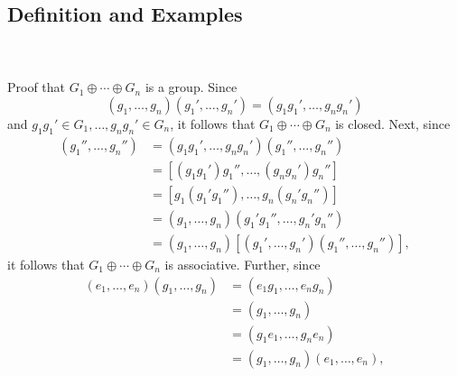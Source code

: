 \documentclass{article}
\theoremstyle{definition}
\newtheorem{definition}{Definition}[section]
\begin{document}
     \subsection{Definition and Examples}
     \\ \\
     Proof that $G_1 \oplus \cdots \oplus G_n$ is  a group. Since
     \begin{equation*}
         (g_1,\dots,g_n)(g_1',\dots,g_n') = (g_1g_1',\dots,g_ng_n')
     \end{equation*}
     and $g_1g_1' \in G_1, \dots, g_ng_n' \in G_n$, it follows that $G_1 \oplus \cdots \oplus G_n$ is closed. Next, since
     \begin{align*}
         [(g_1,\dots,g_n)(g_1',\dots,g_n')](g_1'',\dots,g_n'') &= (g_1g_1',\dots,g_ng_n')(g_1'',\dots,g_n'') \\
         &= [(g_1g_1')g_1'',\dots,(g_ng_n')g_n''] \\
         &= [g_1(g_1'g_1''),\dots,g_n(g_n'g_n'')] \\
         &= (g_1,\dots,g_n)(g_1'g_1'',\dots,g_n'g_n'') \\
         &= (g_1,\dots,g_n)[(g_1',\dots,g_n')(g_1'',\dots,g_n'')],
     \end{align*}
     it follows that $G_1 \oplus \cdots \oplus G_n$ is associative. Further, since
     \begin{align*}
         (e_1,\dots,e_n)(g_1,\dots,g_n) &= (e_1g_1,\dots,e_ng_n) \\
         &= (g_1,\dots,g_n) \\
         &= (g_1e_1,\dots,g_ne_n) \\
         &= (g_1,\dots,g_n)(e_1,\dots,e_n),
     \end{align*}
\end{document}

